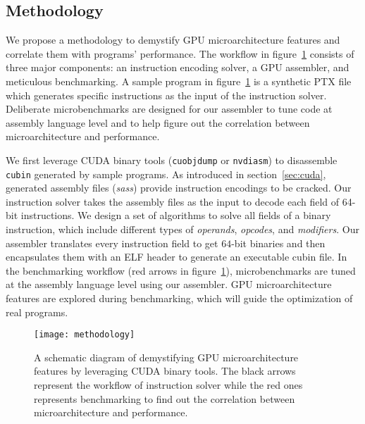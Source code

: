 \subsection{Methodology}


We propose a methodology to demystify GPU microarchitecture features and correlate them with programs' performance.
The workflow in figure~\ref{fig:workflow} consists of three major components: an instruction encoding solver, a GPU assembler, and meticulous benchmarking.
A sample program in figure~\ref{fig:workflow} is a synthetic PTX file which generates specific instructions as the input of the instruction solver.
Deliberate microbenchmarks are designed for our assembler to tune code at assembly language level and to help figure out the correlation between microarchitecture and performance.

We first leverage CUDA binary tools ({\tt cuobjdump} or {\tt nvdiasm}) to disassemble {\tt cubin} generated by sample programs. %
As introduced in section~\ref{sec:cuda}, generated assembly files ({\em sass}) provide instruction encodings to be cracked.
Our instruction solver takes the assembly files as the input to decode each field of 64-bit instructions.
We design a set of algorithms to solve all fields of a binary instruction, which include different types of {\em operands}, {\em opcodes}, and {\em modifiers}.
Our assembler translates every instruction field to get $64$-bit binaries and then encapsulates them with an ELF header to generate an executable cubin file.
In the benchmarking workflow (red arrows in figure~\ref{fig:workflow}), microbenchmarks are tuned at the assembly language level using our assembler.
GPU microarchitecture features are explored during benchmarking, which will guide the optimization of real programs.


\begin{figure}[htbp]
\begin{center}
\texttt{[image: methodology]}
\caption{A schematic diagram of demystifying GPU microarchitecture features by leveraging CUDA binary tools. The black arrows
represent the workflow of instruction solver while the red ones represents benchmarking to find out the correlation between microarchitecture and performance.}
\label{fig:workflow}
\end{center}
\end{figure}
